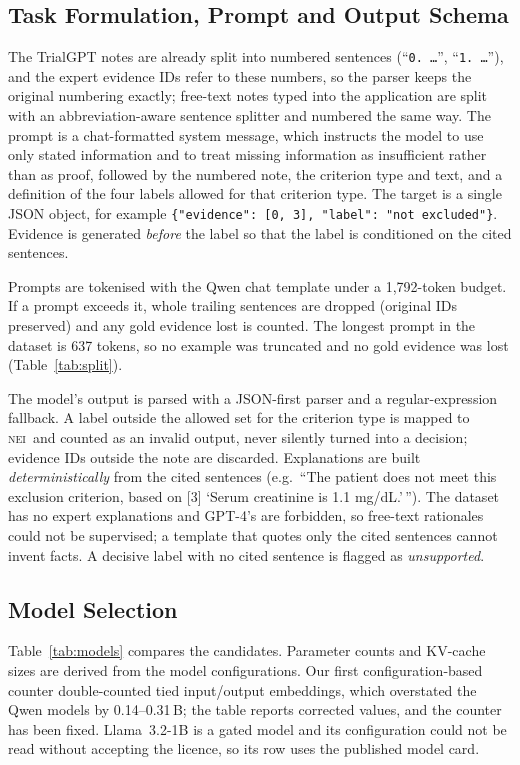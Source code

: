 \documentclass[conference]{IEEEtran}
\newcommand{\NEI}{\textsc{nei}}
\begin{document}
\subsection{Task Formulation, Prompt and Output Schema}
The TrialGPT notes are already split into numbered sentences (``\texttt{0.~\ldots}'', ``\texttt{1.~\ldots}''), and the expert evidence IDs refer to these numbers, so the parser keeps the original numbering exactly; free-text notes typed into the application are split with an abbreviation-aware sentence splitter and numbered the same way. The prompt is a chat-formatted system message, which instructs the model to use only stated information and to treat missing information as insufficient rather than as proof, followed by the numbered note, the criterion type and text, and a definition of the four labels allowed for that criterion type. The target is a single JSON object, for example \texttt{\{"evidence":~[0,~3], "label":~"not excluded"\}}. Evidence is generated \emph{before} the label so that the label is conditioned on the cited sentences.

Prompts are tokenised with the Qwen chat template under a 1{,}792-token budget. If a prompt exceeds it, whole trailing sentences are dropped (original IDs preserved) and any gold evidence lost is counted. The longest prompt in the dataset is 637 tokens, so no example was truncated and no gold evidence was lost (Table~\ref{tab:split}).

The model's output is parsed with a JSON-first parser and a regular-expression fallback. A label outside the allowed set for the criterion type is mapped to \NEI\ and counted as an invalid output, never silently turned into a decision; evidence IDs outside the note are discarded. Explanations are built \emph{deterministically} from the cited sentences (e.g.\ ``The patient does not meet this exclusion criterion, based on [3] `Serum creatinine is 1.1 mg/dL.'\,''). The dataset has no expert explanations and GPT-4's are forbidden, so free-text rationales could not be supervised; a template that quotes only the cited sentences cannot invent facts. A decisive label with no cited sentence is flagged as \emph{unsupported}.

\subsection{Model Selection}
Table~\ref{tab:models} compares the candidates. Parameter counts and KV-cache sizes are derived from the model configurations. Our first configuration-based counter double-counted tied input/output embeddings, which overstated the Qwen models by 0.14--0.31\,B; the table reports corrected values, and the counter has been fixed. Llama~3.2-1B is a gated model and its configuration could not be read without accepting the licence, so its row uses the published model card.
\end{document}
